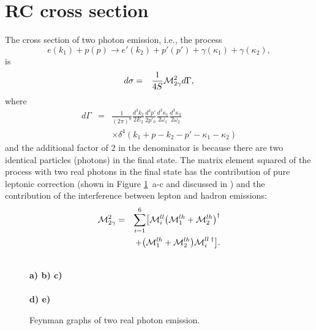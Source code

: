 \documentclass[aps,prd,reprint,groupedaddress,preprintnumbers,showpacs]{revtex4-1}
\begin{document}
\section{\label{RC}RC cross section}

The cross section of two photon emission, i.e., the process
\begin{equation}\label{twogammaprocess}
e(k_1)+p(p)\longrightarrow e'(k_2)+p'(p')+\gamma(\kappa_1)+\gamma(\kappa_2),
\end{equation}
is
\begin{eqnarray}
d\sigma&=&\frac{1}{4S} {\cal M}_{2\gamma}^2 d\Gamma,
\label{xs2g}
\end{eqnarray}
where 
\begin{eqnarray}
d\Gamma&=&\frac 1{(2\pi )^8}
\frac{d^3k_2}{2E_2}
\frac{d^3p'}{2p'_0}
\frac{d^3\kappa_1}{2\omega_1}
\frac{d^3\kappa_2}{2\omega_2}
\nonumber \\&&\times
\delta^4(k_1+p-k_2-p'-\kappa_1-\kappa_2)
\end{eqnarray}
and the additional factor of 2 in the denominator is because there are two identical particles (photons) in the final state. 
The matrix element squared of the process with two real photons in the final state has the contribution of pure leptonic correction 
(shown in Figure \ref{Twoggraphs}~a-c and discussed in \cite{AkushevichIlyichev2012}) and the contribution of the interference between lepton and hadron 
emissions:
\begin{eqnarray}\label{m2sq}
{\cal M}_{2\gamma}^2 &=&\sum_{i=1}^6\bigl[ 
{\cal M}_i^{ll}\bigl( {\cal M}_1^{lh}+{\cal M}_2^{lh}\bigr)^{\dagger}
\nonumber \\&&
+\bigl( {\cal M}_1^{lh}+{\cal M}_2^{lh}\bigr) {\cal M}_i^{ll\;\dagger}\bigr].
\end{eqnarray}
\begin{figure}[t]\centering
{}
\hspace{0.25cm}
\hspace{0.25cm}
\\
{\bf a) \hspace{1.8cm} b) \hspace{1.8cm} c)}
\\[2mm]
\hspace{0.25cm}
\\
{\bf d) \hspace{1.8cm} e)}
\caption{\label{Twoggraphs}Feynman graphs of two real photon emission.}
 \end{figure}
\end{document}
